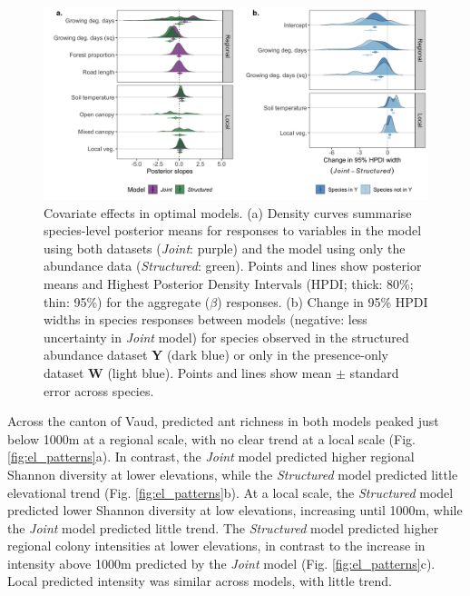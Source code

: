 \documentclass[preprint,final,times,12pt,3p]{elsarticle}
\begin{document}
\begin{figure}
\centering\includegraphics[width=6in]{../../../ms/1_Ecography/1/figs/slope_means+HDI.png}
\caption{\label{fig:slope_means} Covariate effects in optimal models. (a) Density curves summarise species-level posterior means for responses to variables in the model using both datasets (\emph{Joint}: purple) and the model using only the abundance data (\emph{Structured}: green). Points and lines show posterior means and Highest Posterior Density Intervals (HPDI; thick: 80\%; thin: 95\%) for the aggregate ($\beta$) responses. (b) Change in 95\% HPDI widths in species responses between models (negative: less uncertainty in \emph{Joint} model) for species observed in the structured abundance dataset \textbf{Y} (dark blue) or only in the presence-only dataset \textbf{W} (light blue). Points and lines show mean $\pm$ standard error across species. }
\end{figure}

Across the canton of Vaud, predicted ant richness in both models peaked just below 1000m at a regional scale, with no clear trend at a local scale (Fig. \ref{fig:el_patterns}a). In contrast, the \emph{Joint} model predicted higher regional Shannon diversity at lower elevations, while the \emph{Structured} model predicted little elevational trend (Fig. \ref{fig:el_patterns}b). At a local scale, the \emph{Structured} model predicted lower Shannon diversity at low elevations, increasing until 1000m, while the \emph{Joint} model predicted little trend. The \emph{Structured} model predicted higher regional colony intensities at lower elevations, in contrast to the increase in intensity above 1000m predicted by the \emph{Joint} model (Fig. \ref{fig:el_patterns}c). Local predicted intensity was similar across models, with little trend. 
\end{document}
